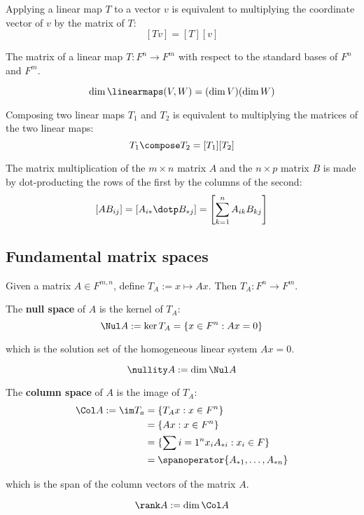 \begin{lemma}
  Applying a linear map $T$ to a vector $v$ is equivalent to multiplying the coordinate vector of $v$ by the matrix of $T$:
  \[
    [Tv] = [T][v]
  \]
\end{lemma}

\begin{definition}
  The matrix of a linear map $T : F^n \to F^m$ with respect to the standard bases of $F^n$ and $F^m$.
\end{definition}

\begin{lemma}
  \[
    \dim \linearmaps(V, W) = (\dim V) (\dim W)
  \]
\end{lemma}

\begin{lemma}
  Composing two linear maps $T_1$ and $T_2$ is equivalent to multiplying the matrices of the two linear maps:
  \[
    T_1 \compose T_2 = [T_1] [T_2]
  \]
\end{lemma}

\begin{definition}
  The matrix multiplication of  the $m \times n$ matrix $A$ and the $n \times p$ matrix $B$ is made by dot-producting the rows of the first by the columns of the second:
  \[
    \left[AB_{ij}\right] = \left[A_{i*} \dotp B_{*j}\right] = \left[\sum_{k=1}^n A_{ik} B_{kj} \right]
  \]
\end{definition}

\subsection{Fundamental matrix spaces}

Given a matrix $A \in F^{m,n}$, define $T_A := x \mapsto Ax$. Then $T_A : F^n \to F^m$.

\begin{definition}
  The \textbf{null space} of $A$ is the kernel of $T_A$:
  \[
    \Nul A := \ker T_A = \{x \in F^n : Ax = 0\}
  \]

  which is the solution set of the homogeneous linear system $Ax = 0$. 

  \[
    \nullity A := \dim \Nul A
  \]
\end{definition}

\begin{definition}
  The \textbf{column space} of $A$ is the image of $T_A$:
  \begin{align*}
    \Col A := \im T_a 
    &= \{T_A x : x \in F^n \} \\
    &= \{Ax : x \in F^n \} \\
    &= \{ \sum{i = 1}^n x_i A_{*i} : x_i \in F \} \\
    &= \spanoperator \{ A_{*1}, \ldots, A_{*n} \}
  \end{align*}

  which is the span of the column vectors of the matrix $A$.

  \[
    \rank A := \dim \Col A
  \]
\end{definition}

